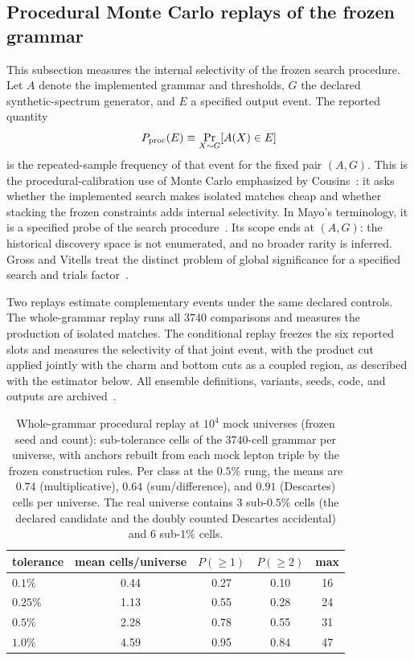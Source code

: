 \documentclass[aps,twocolumn,superscriptaddress,nofootinbib,floatfix]{revtex4-2}
\begin{document}
\subsection{Procedural Monte Carlo replays of the frozen grammar}
\label{sec:mcnull}

This subsection measures the internal selectivity of the frozen search procedure. Let $A$ denote the implemented grammar and thresholds, $G$ the declared synthetic-spectrum generator, and $E$ a specified output event. The reported quantity
\begin{equation}
P_{\rm proc}(E)\equiv\Pr_{X\sim G}[A(X)\in E]
\label{eq:pproc}
\end{equation}
is the repeated-sample frequency of that event for the fixed pair $(A,G)$. This is the procedural-calibration use of Monte Carlo emphasized by Cousins~\cite{Cousins2018}: it asks whether the implemented search makes isolated matches cheap and whether stacking the frozen constraints adds internal selectivity. In Mayo's terminology, it is a specified probe of the search procedure~\cite{Mayo2018}. Its scope ends at $(A,G)$: the historical discovery space is not enumerated, and no broader rarity is inferred. Gross and Vitells treat the distinct problem of global significance for a specified search and trials factor~\cite{GrossVitells}.

Two replays estimate complementary events under the same declared controls. The whole-grammar replay runs all 3740 comparisons and measures the production of isolated matches. The conditional replay freezes the six reported slots and measures the selectivity of that joint event, with the product cut applied jointly with the charm and bottom cuts as a coupled region, as described with the estimator below. All ensemble definitions, variants, seeds, code, and outputs are archived~\cite{BrilliantGitHubEnum,BrilliantZenodoSupp}.

\begin{table}[t]
\caption{Whole-grammar procedural replay at $10^4$ mock universes (frozen seed and count): sub-tolerance cells of the $3740$-cell grammar per universe, with anchors
rebuilt from each mock lepton triple by the frozen construction rules. Per
class at the $0.5\%$ rung, the means are $0.74$ (multiplicative), $0.64$
(sum/difference), and $0.91$ (Descartes) cells per universe. The real
universe contains $3$ sub-$0.5\%$ cells (the declared candidate and the
doubly counted Descartes accidental) and $6$ sub-$1\%$ cells.}
\label{tab:mcnulla}
\begin{ruledtabular}
\begin{tabular}{lcccc}
tolerance & mean cells/universe & $P(\ge1)$ & $P(\ge2)$ & max \\
\hline
$0.1\%$ & 0.44 & 0.27 & 0.10 & 16 \\
$0.25\%$ & 1.13 & 0.55 & 0.28 & 24 \\
$0.5\%$ & 2.28 & 0.78 & 0.55 & 31 \\
$1.0\%$ & 4.59 & 0.95 & 0.84 & 47 \\
\end{tabular}
\end{ruledtabular}
\end{table}
\end{document}
